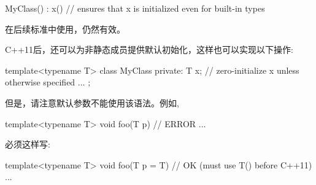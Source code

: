 \begin{cpp}
MyClass() : x() { // ensures that x is initialized even for built-in types
}
\end{cpp}

在后续标准中使用，仍然有效。

C++11后，还可以为非静态成员提供默认初始化，这样也可以实现以下操作:

\begin{cpp}
template<typename T>
class MyClass {
private:
	T x{}; // zero-initialize x unless otherwise specified
	...
};
\end{cpp}

但是，请注意默认参数不能使用该语法。例如,

\begin{cpp}
template<typename T>
void foo(T p{}) { // ERROR
	...
}
\end{cpp}

必须这样写:

\begin{cpp}
template<typename T>
void foo(T p = T{}) { // OK (must use T() before C++11)
	...
}
\end{cpp}





















